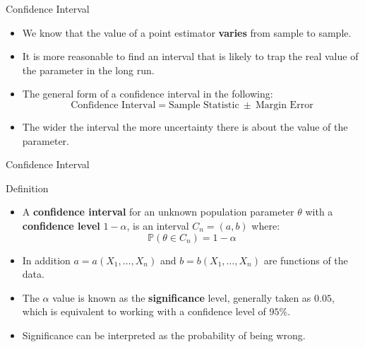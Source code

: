 \documentclass[handout]{beamer}
\begin{document}
\begin{frame}{Confidence Interval}
\scriptsize{
\begin{itemize}
 \item We know that the value of a point estimator \textbf{varies} from sample to sample.
 \item It is more reasonable to find an interval that is likely to trap the real value of the parameter in the long run.
 \item The general form of a confidence interval in the following:
  \begin{displaymath}
   \text{Confidence Interval} = \text{Sample Statistic} \ \pm \ \text{Margin Error}
  \end{displaymath}
 \item The wider the interval the more uncertainty there is about the value of the parameter.
\end{itemize}


}
 
\end{frame}


\begin{frame}{Confidence Interval }
\scriptsize{

\begin{block}{Definition}
\begin{itemize}
 \item A \textbf{confidence interval} for an unknown population parameter $\theta$ with a \textbf{confidence level} $1-\alpha$, is an interval $C_n = (a,b)$ where:
 \begin{displaymath}
 \mathbb{P}(\theta \in C_n) = 1-\alpha
\end{displaymath}
 \item In addition $a= a(X_1, \dots, X_n)$ and $b=b(X_1,\dots,X_n)$ are functions of the data.
 \item The $\alpha$ value is known as the \textbf{significance} level, generally taken as $0.05$, which is equivalent to working with a confidence level of $95\%$.
 \item Significance can be interpreted as the probability of being wrong.
\end{itemize}

\end{block}

}
 
\end{frame}
\end{document}
